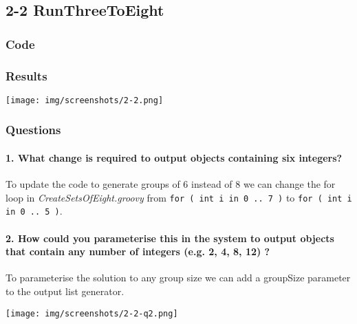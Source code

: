 \subsection{2-2 RunThreeToEight}

\subsubsection*{Code}


\subsubsection*{Results}

\texttt{[image: img/screenshots/2-2.png]}


\subsubsection*{Questions}

\paragraph{1. What change is required to output objects containing six integers?}

To update the code to generate groups of 6 instead of 8 we can change the for loop in {\em CreateSetsOfEight.groovy} from \texttt{for ( int i in 0 .. 7 )} to \texttt{for ( int i in 0 .. 5 )}.

\paragraph{2. How could you parameterise this in the system to output objects that contain any number of integers (e.g. 2, 4, 8, 12) ?}

To parameterise the solution to any group size we can add a groupSize parameter to the output list generator.



\texttt{[image: img/screenshots/2-2-q2.png]}